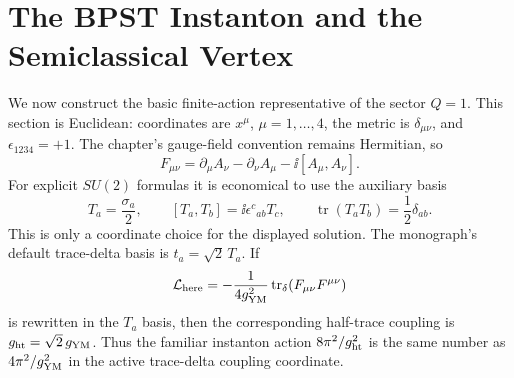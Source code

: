 \section{The BPST Instanton and the Semiclassical Vertex}
\label{sec:bpst-instanton-thooft-vertex}

We now construct the basic finite-action representative of the sector
\(Q=1\).  This section is Euclidean: coordinates are
\(x^\mu\), \(\mu=1,\ldots,4\), the metric is \(\delta_{\mu\nu}\), and
\(\epsilon_{1234}=+1\).  The chapter's gauge-field convention remains
Hermitian, so
\[
  F_{\mu\nu}
  =
  \partial_\mu A_\nu-\partial_\nu A_\mu-\ii[A_\mu,A_\nu].
\]
For explicit \(SU(2)\) formulas it is economical to use the auxiliary basis
\[
  T_a=\frac{\sigma_a}{2},
  \qquad
  [T_a,T_b]=\ii\epsilon^c{}_{ab}T_c,
  \qquad
  \operatorname{tr}(T_aT_b)=\frac12\delta_{ab}.
\]
This is only a coordinate choice for the displayed solution.  The monograph's
default trace-delta basis is \(t_a=\sqrt2\,T_a\).  If
\[
  \mathcal L_{\rm here}
  =
  -\frac1{4g_{\rm YM}^2}
  \operatorname{tr}_{\delta}(F_{\mu\nu}F^{\mu\nu})
\]
is rewritten in the \(T_a\) basis, then the corresponding half-trace coupling
is \(g_{\rm ht}=\sqrt2\,g_{\rm YM}\).  Thus the familiar instanton action
\(8\pi^2/g_{\rm ht}^2\) is the same number as
\(4\pi^2/g_{\rm YM}^2\) in the active trace-delta coupling coordinate.


